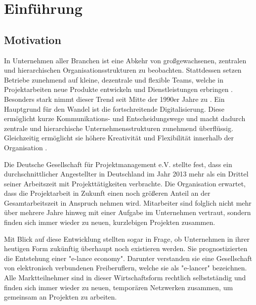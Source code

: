 \chapter{Einführung}
\label{ch:intro}

\section{Motivation}
\label{sec:intro:motivation}
In Unternehmen aller Branchen ist eine Abkehr von großgewachsenen, zentralen und hierarchischen Organisationsstrukturen zu beobachten. Stattdessen setzen Betriebe zunehmend auf kleine, dezentrale und flexible Teams, welche in Projektarbeiten neue Produkte entwickeln und Dienstleistungen erbringen \cite[S. 3]{elanceEconomy:1999}. Besonders stark nimmt dieser Trend seit Mitte der 1990er Jahre zu \cite[S. 8]{whittington:1999}. Ein Hauptgrund für den Wandel ist die fortschreitende Digitalisierung. Diese ermöglicht kurze Kommunikations- und Entscheidungswege und macht dadurch zentrale und hierarchische Unternehmensstrukturen zunehmend überflüssig. Gleichzeitig ermöglicht sie höhere Kreativität und Flexibilität innerhalb der Organisation \cite[S. 5]{elanceEconomy:1999}.

Die Deutsche Gesellschaft für Projektmanagement e.V. \cite[S. 16]{gpm:2015} stellte fest, dass ein durchschnittlicher Angestellter in Deutschland im Jahr 2013 mehr als ein Drittel seiner Arbeitszeit mit Projekttätigkeiten verbrachte. Die Organisation erwartet, dass die Projektarbeit in Zukunft einen noch größeren Anteil an der Gesamtarbeitszeit in Anspruch nehmen wird. Mitarbeiter sind folglich nicht mehr über mehrere Jahre hinweg mit einer Aufgabe im Unternehmen vertraut, sondern finden sich immer wieder zu neuen, kurzlebigen Projekten zusammen.

Mit Blick auf diese Entwicklung stellten \textcite[S. 2ff.]{elanceEconomy:1999} sogar in Frage, ob Unternehmen in ihrer heutigen Form zukünftig überhaupt noch existieren werden. Sie prognostizierten die Entstehung einer "e-lance economy". Darunter verstanden sie eine Gesellschaft von elektronisch verbundenen Freiberuflern, welche sie als "e-lancer" bezeichnen. Alle Marktteilnehmer sind in dieser Wirtschaftsform rechtlich selbstständig und finden sich immer wieder zu neuen, temporären Netzwerken zusammen, um gemeinsam an Projekten zu arbeiten.

